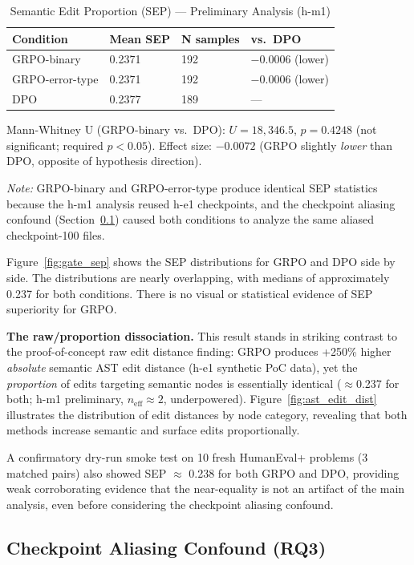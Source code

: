 \begin{table}[h]
\centering
\caption{Semantic Edit Proportion (SEP) --- Preliminary Analysis (h-m1)}
\label{tab:sep_results}
\begin{tabular}{llll}
\toprule
\textbf{Condition} & \textbf{Mean SEP} & \textbf{N samples} & \textbf{vs.\ DPO} \\
\midrule
GRPO-binary & 0.2371 & 192 & $-$0.0006 (lower) \\
GRPO-error-type & 0.2371 & 192 & $-$0.0006 (lower) \\
DPO & 0.2377 & 189 & --- \\
\bottomrule
\end{tabular}
\end{table}

Mann-Whitney U (GRPO-binary vs.\ DPO): $U = 18{,}346.5$, $p = 0.4248$ (not significant; required $p < 0.05$).
Effect size: $-0.0072$ (GRPO slightly \emph{lower} than DPO, opposite of hypothesis direction).

\textit{Note:} GRPO-binary and GRPO-error-type produce identical SEP statistics because the h-m1 analysis
reused h-e1 checkpoints, and the checkpoint aliasing confound (Section~\ref{sec:aliasing}) caused
both conditions to analyze the same aliased checkpoint-100 files.

Figure~\ref{fig:gate_sep} shows the SEP distributions for GRPO and DPO side by side.
The distributions are nearly overlapping, with medians of approximately 0.237 for
both conditions. There is no visual or statistical evidence of SEP superiority for GRPO.

\textbf{The raw/proportion dissociation.} This result stands in striking contrast
to the proof-of-concept raw edit distance finding: GRPO produces
+250\% higher \emph{absolute} semantic AST edit distance (h-e1 synthetic PoC data),
yet the \emph{proportion} of edits targeting semantic nodes is essentially identical
($\approx$0.237 for both; h-m1 preliminary, $n_\text{eff}\approx2$, underpowered).
Figure~\ref{fig:ast_edit_dist} illustrates the distribution of edit distances by node category,
revealing that both methods increase semantic and surface edits proportionally.

A confirmatory dry-run smoke test on 10 fresh HumanEval+ problems (3 matched
pairs) also showed SEP $\approx$ 0.238 for both GRPO and DPO, providing weak
corroborating evidence that the near-equality is not an artifact of the
main analysis, even before considering the checkpoint aliasing confound.

\subsection{Checkpoint Aliasing Confound (RQ3)}
\label{sec:aliasing}


